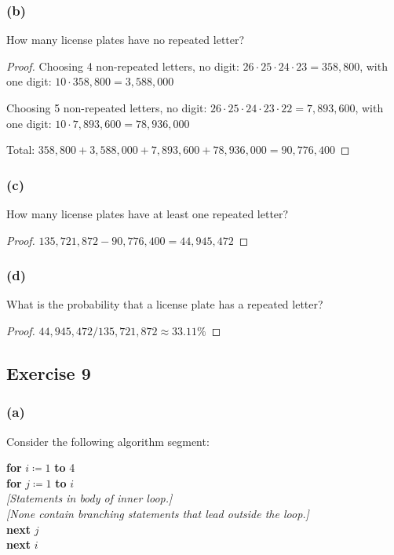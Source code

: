 \documentclass[14pt]{extarticle}
\begin{document}
\subsubsection{(b)}
How many license plates have no repeated letter?

\begin{proof}
     Choosing 4 non-repeated letters, no digit: \(26 \cdot 25 \cdot 24 \cdot 23 = 358,800\), with one digit: \(10 \cdot
     358,800 = 3,588,000\)

     Choosing 5 non-repeated letters, no digit: \(26 \cdot 25 \cdot 24 \cdot 23 \cdot 22 = 7,893,600\), with one digit:
     \(10 \cdot 7,893,600 = 78,936,000\)

     Total: \(358,800 + 3,588,000 + 7,893,600 + 78,936,000 = 90,776,400\)
\end{proof}

\subsubsection{(c)}
How many license plates have at least one repeated letter?

\begin{proof}
     \(135,721,872 - 90,776,400 = 44,945,472\)
\end{proof}

\subsubsection{(d)}
What is the probability that a license plate has a repeated letter?

\begin{proof}
     \(44,945,472 / 135,721,872 \approx 33.11\%\)
\end{proof}

\subsection{Exercise 9}
\subsubsection{(a)}
Consider the following algorithm segment:

\begin{tabbing}
     {\bf for} \= \(i \coloneqq 1\) {\bf to} 4 \\
     \> {\bf for} \= \(j \coloneqq 1\) {\bf to} $i$ \\
     \>           \> {\it [Statements in body of inner loop.]} \\
     \>           \> {\it [None contain branching statements that lead outside the loop.]} \\
     \> {\bf next} $j$ \\
     {\bf next} $i$
\end{tabbing}
\end{document}
